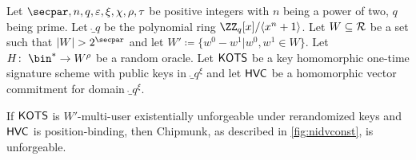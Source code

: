 \begin{lemma}\label{lem:msigunf}
Let $\secpar,n,q,\varepsilon,\xi,\chi,\rho,\tau$ be positive integers with $n$ being a power of two, $q$ being prime.
Let $\ring_q$ be the polynomial ring $\ZZ_q[x]/\langle x^n+1\rangle$.
Let $W \subseteq \mathcal{R}$ be a set such that $|W| > 2^\secpar$ and let $W' \coloneqq \{w^0-w^1| w^0,w^1 \in W\}$.
Let $H\colon\; \bin^* \to W^\rho$ be a random oracle.
Let $\mathsf{KOTS}$ be a key homomorphic one-time signature scheme with public keys in $\ring_q^\xi$ and let $\mathsf{HVC}$ be a homomorphic vector commitment for domain $\ring_q^\xi$.

If $\mathsf{KOTS}$ is $W'$-multi-user existentially unforgeable under rerandomized keys and $\mathsf{HVC}$ is position-binding, then Chipmunk, as described in \autoref{fig:nidvconst}, is unforgeable.
\end{lemma}

